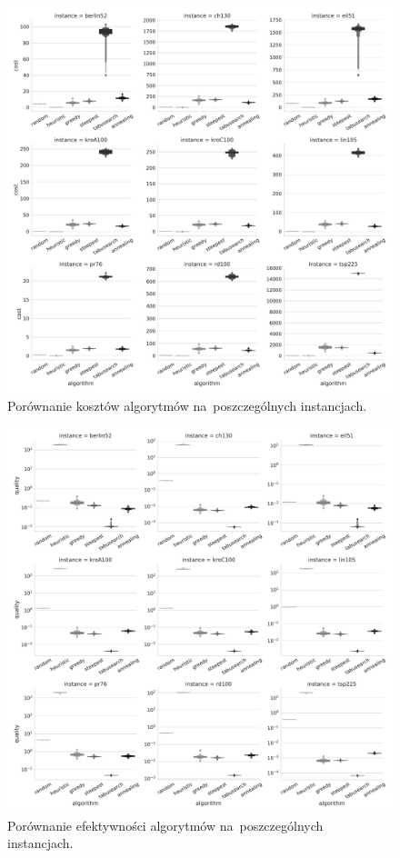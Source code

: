 \begin{figure}[H]
\begin{center}
\includegraphics[width=1.0\textwidth]{graphs/cost_comparison_letval.pdf}
\end{center}
\caption{Porównanie kosztów algorytmów na~poszczególnych instancjach.}
\label{fig:cost}
\end{figure}

\begin{figure}[H]
\begin{center}
\includegraphics[width=1.0\textwidth]{graphs/quality_comparison_letval.pdf}
\end{center}
\caption{Porównanie efektywności algorytmów na~poszczególnych instancjach.}
\label{fig:quality}
\end{figure}


